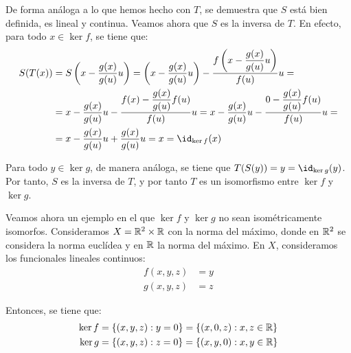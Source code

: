 \begin{ejercicio}
\begin{description}
    De forma análoga a lo que hemos hecho con $T$, se demuestra que $S$ está bien definida, es lineal y continua. Veamos ahora que $S$ es la inversa de $T$. En efecto, para todo $x \in \ker f$, se tiene que:
    \begin{align*}
        S(T(x)) &= S\left(x - \dfrac{g(x)}{g(u)} u\right) = \left(x - \dfrac{g(x)}{g(u)} u\right) - \dfrac{f\left(x - \dfrac{g(x)}{g(u)} u\right)}{f(u)} u
        =\\&= x - \dfrac{g(x)}{g(u)} u - \dfrac{f(x) - \dfrac{g(x)}{g(u)} f(u)}{f(u)} u
        = x - \dfrac{g(x)}{g(u)} u - \dfrac{0 - \dfrac{g(x)}{g(u)} f(u)}{f(u)} u
        =\\&= x - \dfrac{g(x)}{g(u)} u + \dfrac{g(x)}{g(u)} u = x = \id_{\ker f}(x)
    \end{align*}



    Para todo $y \in \ker g$, de manera análoga, se tiene que $T(S(y)) = y = \id_{\ker g}(y)$. Por tanto, $S$ es la inversa de $T$, y por tanto $T$ es un isomorfismo entre $\ker f$ y $\ker g$.
    \end{description}

    Veamos ahora un ejemplo en el que $\ker f$ y $\ker g$ no sean isométricamente isomorfos. Consideramos $X = \mathbb{R}^2\times \mathbb{R}$ con la norma del máximo, donde en $\mathbb{R}^2$ se considera la norma euclídea y en $\mathbb{R}$ la norma del máximo. En $X$, consideramos los funcionales lineales continuos:
    \begin{align*}
        f(x, y, z) &= y\\
        g(x, y, z) &= z
    \end{align*}

    Entonces, se tiene que:
    \begin{align*}
        \ker f &= \left\{(x, y, z) : y = 0\right\} = \left\{(x, 0, z) : x, z \in \mathbb{R}\right\}\\
        \ker g &= \left\{(x, y, z) : z = 0\right\} = \left\{(x, y, 0) : x, y \in \mathbb{R}\right\}
    \end{align*}


\end{ejercicio}

